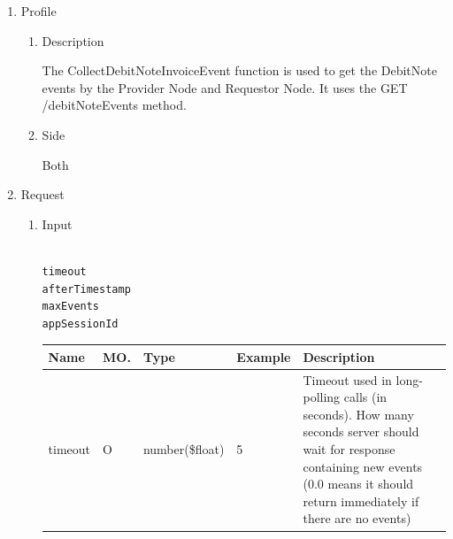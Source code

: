 \begin{enumerate}

\item Profile

\begin{enumerate}

\item Description

The CollectDebitNoteInvoiceEvent function is used to get the DebitNote events by the Provider Node and Requestor Node. 
It uses the GET /debitNoteEvents method.
 
\item Side

Both

\end{enumerate}

\item Request

\begin{enumerate}

\item Input

\begin{tcolorbox}[boxrule=0pt, frame empty]
\begin{verbatim}

timeout
afterTimestamp
maxEvents
appSessionId

\end{verbatim}
\end{tcolorbox}


\begin{table}[H]
\footnotesize

\begin{center}
\begin{tabular}{|p{3cm}|l|p{3cm}|p{3cm}|p{4cm}|} 
\hline
\rowcolor{lightgray}	Name	& MO.	& Type	& Example & 	Description \\
\hline

timeout					& O	& 	number(\$float)		&	5							&	Timeout used in long-polling calls (in seconds). 
																						How many seconds server should wait for response containing new events 
																						(0.0 means it should return immediately if there are no events) \\ 
\hline


\end{tabular}
\end{center}
\end{table}
\end{enumerate}
\end{enumerate}
